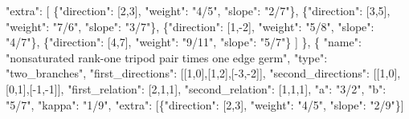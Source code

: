 \documentclass[
  11pt,
]{article}
\newenvironment{Shaded}{}{}
\newcommand{\DataTypeTok}[1]{\textcolor[rgb]{0.56,0.13,0.00}{#1}}
\newcommand{\DecValTok}[1]{\textcolor[rgb]{0.25,0.63,0.44}{#1}}
\newcommand{\FunctionTok}[1]{\textcolor[rgb]{0.02,0.16,0.49}{#1}}
\newcommand{\OtherTok}[1]{\textcolor[rgb]{0.00,0.44,0.13}{#1}}
\newcommand{\StringTok}[1]{\textcolor[rgb]{0.25,0.44,0.63}{#1}}
\begin{document}
\begin{Shaded}
\begin{Highlighting}[]
      \DataTypeTok{"extra"}\FunctionTok{:} \OtherTok{[}
        \FunctionTok{\{}\DataTypeTok{"direction"}\FunctionTok{:} \OtherTok{[}\DecValTok{2}\OtherTok{,}\DecValTok{3}\OtherTok{]}\FunctionTok{,} \DataTypeTok{"weight"}\FunctionTok{:} \StringTok{"4/5"}\FunctionTok{,} \DataTypeTok{"slope"}\FunctionTok{:} \StringTok{"2/7"}\FunctionTok{\}}\OtherTok{,}
        \FunctionTok{\{}\DataTypeTok{"direction"}\FunctionTok{:} \OtherTok{[}\DecValTok{3}\OtherTok{,}\DecValTok{5}\OtherTok{]}\FunctionTok{,} \DataTypeTok{"weight"}\FunctionTok{:} \StringTok{"7/6"}\FunctionTok{,} \DataTypeTok{"slope"}\FunctionTok{:} \StringTok{"3/7"}\FunctionTok{\}}\OtherTok{,}
        \FunctionTok{\{}\DataTypeTok{"direction"}\FunctionTok{:} \OtherTok{[}\DecValTok{1}\OtherTok{,}\DecValTok{{-}2}\OtherTok{]}\FunctionTok{,} \DataTypeTok{"weight"}\FunctionTok{:} \StringTok{"5/8"}\FunctionTok{,} \DataTypeTok{"slope"}\FunctionTok{:} \StringTok{"4/7"}\FunctionTok{\}}\OtherTok{,}
        \FunctionTok{\{}\DataTypeTok{"direction"}\FunctionTok{:} \OtherTok{[}\DecValTok{4}\OtherTok{,}\DecValTok{7}\OtherTok{]}\FunctionTok{,} \DataTypeTok{"weight"}\FunctionTok{:} \StringTok{"9/11"}\FunctionTok{,} \DataTypeTok{"slope"}\FunctionTok{:} \StringTok{"5/7"}\FunctionTok{\}}
      \OtherTok{]}
    \FunctionTok{\}}\OtherTok{,}
    \FunctionTok{\{}
      \DataTypeTok{"name"}\FunctionTok{:} \StringTok{"nonsaturated rank{-}one tripod pair times one edge germ"}\FunctionTok{,}
      \DataTypeTok{"type"}\FunctionTok{:} \StringTok{"two\_branches"}\FunctionTok{,}
      \DataTypeTok{"first\_directions"}\FunctionTok{:} \OtherTok{[[}\DecValTok{1}\OtherTok{,}\DecValTok{0}\OtherTok{],[}\DecValTok{1}\OtherTok{,}\DecValTok{2}\OtherTok{],[}\DecValTok{{-}3}\OtherTok{,}\DecValTok{{-}2}\OtherTok{]]}\FunctionTok{,}
      \DataTypeTok{"second\_directions"}\FunctionTok{:} \OtherTok{[[}\DecValTok{1}\OtherTok{,}\DecValTok{0}\OtherTok{],[}\DecValTok{0}\OtherTok{,}\DecValTok{1}\OtherTok{],[}\DecValTok{{-}1}\OtherTok{,}\DecValTok{{-}1}\OtherTok{]]}\FunctionTok{,}
      \DataTypeTok{"first\_relation"}\FunctionTok{:} \OtherTok{[}\DecValTok{2}\OtherTok{,}\DecValTok{1}\OtherTok{,}\DecValTok{1}\OtherTok{]}\FunctionTok{,} \DataTypeTok{"second\_relation"}\FunctionTok{:} \OtherTok{[}\DecValTok{1}\OtherTok{,}\DecValTok{1}\OtherTok{,}\DecValTok{1}\OtherTok{]}\FunctionTok{,}
      \DataTypeTok{"a"}\FunctionTok{:} \StringTok{"3/2"}\FunctionTok{,} \DataTypeTok{"b"}\FunctionTok{:} \StringTok{"5/7"}\FunctionTok{,} \DataTypeTok{"kappa"}\FunctionTok{:} \StringTok{"1/9"}\FunctionTok{,}
      \DataTypeTok{"extra"}\FunctionTok{:} \OtherTok{[}\FunctionTok{\{}\DataTypeTok{"direction"}\FunctionTok{:} \OtherTok{[}\DecValTok{2}\OtherTok{,}\DecValTok{3}\OtherTok{]}\FunctionTok{,} \DataTypeTok{"weight"}\FunctionTok{:} \StringTok{"4/5"}\FunctionTok{,} \DataTypeTok{"slope"}\FunctionTok{:} \StringTok{"2/9"}\FunctionTok{\}}\OtherTok{]}

\end{Highlighting}
\end{Shaded}
\end{document}
